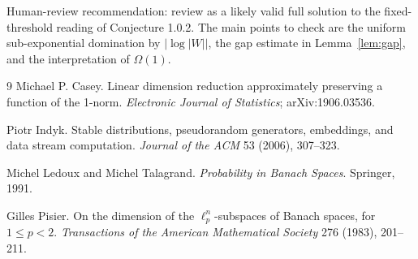 \documentclass[11pt]{article}
\newcommand{\abs}[1]{\left\lvert #1\right\rvert}
\begin{document}
Human-review recommendation: review as a likely valid full solution to the
fixed-threshold reading of Conjecture 1.0.2.  The main points to check are the
uniform sub-exponential domination by \(\abs{\log\abs W}\), the gap estimate in
Lemma~\ref{lem:gap}, and the interpretation of \(\Omega(1)\).

\begin{thebibliography}{9}
Michael P. Casey.
\newblock Linear dimension reduction approximately preserving a function of the
1-norm.
\newblock \emph{Electronic Journal of Statistics}; arXiv:1906.03536.

Piotr Indyk.
\newblock Stable distributions, pseudorandom generators, embeddings, and data
stream computation.
\newblock \emph{Journal of the ACM} 53 (2006), 307--323.

Michel Ledoux and Michel Talagrand.
\newblock \emph{Probability in Banach Spaces}.
\newblock Springer, 1991.

Gilles Pisier.
\newblock On the dimension of the \(\ell_p^n\)-subspaces of Banach spaces, for
\(1\leq p<2\).
\newblock \emph{Transactions of the American Mathematical Society} 276 (1983),
201--211.
\end{thebibliography}
\end{document}

